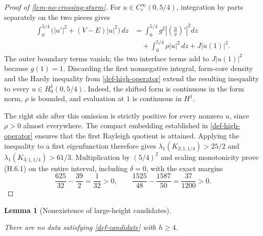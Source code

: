 \documentclass[11pt,a4paper]{article}
\theoremstyle{proofmanuscript}
\newtheorem{lemma}[theorem]{Lemma}
\begin{document}
\begin{proof}[Proof of \ref{lem-no-crossing-sturm}]
For \(u\in C_c^\infty(0,5/4)\), integration by parts separately on the two pieces gives \[
\begin{aligned}
\int_0^{5/4}\bigl(|u'|^2+(V-E)|u|^2\bigr)\,dz
&=\int_0^{5/4}g^2\left|\left(\frac ug\right)'\right|^2 dz\\
&\quad+\int_0^{5/4}\rho|u|^2\,dz+J|u(1)|^2.
\end{aligned}
\tag{H.6.9}
\] The outer boundary terms vanish; the two interface terms add to \(J|u(1)|^2\) because \(g(1)=1\). Discarding the first nonnegative integral, form-core density and the Hardy inequality from \ref{def-high-operator} extend the resulting inequality to every \(u\in H_0^1(0,5/4)\). Indeed, the shifted form is continuous in the form norm, \(\rho\) is bounded, and evaluation at \(1\) is continuous in \(H^1\).

The right side after this omission is strictly positive for every nonzero \(u\), since \(\rho>0\) almost everywhere. The compact embedding established in \ref{def-high-operator} ensures that the first Rayleigh quotient is attained. Applying the inequality to a first eigenfunction therefore gives \(\lambda_1(K_{2;1,1/4})>25/2\) and \(\lambda_1(K_{3;1,1/4})>61/3\). Multiplication by \((5/4)^2\) and scaling monotonicity prove (H.6.1) on the entire interval, including \(\delta=0\), with the exact margins \[
\frac{625}{32}-\frac{39}{2}=\frac1{32}>0,
\qquad
\frac{1525}{48}-\frac{1587}{50}=\frac{37}{1200}>0.
\]

\end{proof}

\begin{lemma}[Nonexistence of large-height candidates]\label{lem-high}

There are no data satisfying \ref{def-candidate} with \(h\ge4\).

\end{lemma}
\end{document}
